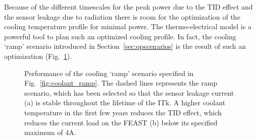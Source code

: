 Because of the different timescales for the peak power due to the TID effect and the sensor leakage due to radiation there is room for the optimization of the cooling temperature profile for minimal power. The thermo-electrical model is a powerful tool to plan such an optimized cooling profile. In fact, the cooling `ramp' scenario introduced in Section~\ref{sec:opscenarios} is the result of such an optimization (Fig.~\ref{fig:rampoptimization}).

\begin{figure}[ht]
\centering
{}
\caption{Performance of the cooling `ramp' scenario specified in Fig.~\ref{fig:coolant_ramp}. The dashed lines represents the ramp scenario, which has been selected so that the sensor leakage current (a) is stable throughout the lifetime of the ITk. A higher coolant temperature in the first few years reduces the TID effect, which reduces the current load on the FEAST (b) below its specified maximum of 4A.}
\label{fig:rampoptimization}
\end{figure}
